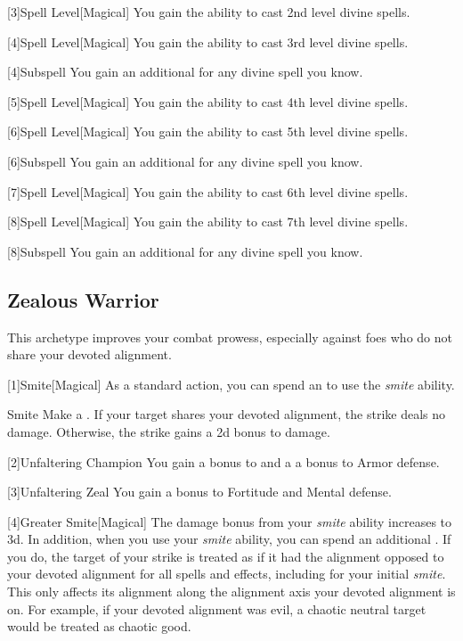         [3]{Spell Level}[Magical] You gain the ability to cast 2nd level divine spells.

        [4]{Spell Level}[Magical] You gain the ability to cast 3rd level divine spells.

        [4]{Subspell} You gain an additional  for any divine spell you know.

        [5]{Spell Level}[Magical] You gain the ability to cast 4th level divine spells.

        [6]{Spell Level}[Magical] You gain the ability to cast 5th level divine spells.

        [6]{Subspell} You gain an additional  for any divine spell you know.

        [7]{Spell Level}[Magical] You gain the ability to cast 6th level divine spells.

        [8]{Spell Level}[Magical] You gain the ability to cast 7th level divine spells.

        [8]{Subspell} You gain an additional  for any divine spell you know.

    \subsection{Zealous Warrior}
        This archetype improves your combat prowess, especially against foes who do not share your devoted alignment.

        [1]{Smite}[Magical] As a standard action, you can spend an  to use the \textit{smite} ability.
        \begin{ability}{Smite}
            Make a .
            If your target shares your devoted alignment, the strike deals no damage.
            Otherwise, the strike gains a \plus2d bonus to damage.
        \end{ability}

        [2]{Unfaltering Champion}
        You gain a  bonus to  and a a  bonus to Armor defense.

        [3]{Unfaltering Zeal}
        You gain a  bonus to Fortitude and Mental defense.

        [4]{Greater Smite}[Magical] The damage bonus from your \textit{smite} ability increases to \plus3d.
        In addition, when you use your \textit{smite} ability, you can spend an additional .
        If you do, the target of your strike is treated as if it had the alignment opposed to your devoted alignment for all spells and effects, including for your initial \textit{smite}.
        This only affects its alignment along the alignment axis your devoted alignment is on.
        For example, if your devoted alignment was evil, a chaotic neutral target would be treated as chaotic good.

